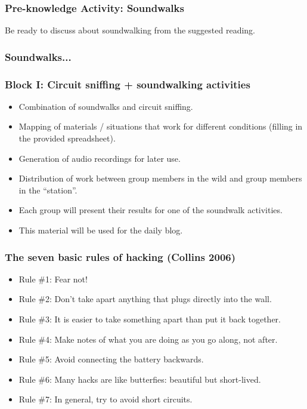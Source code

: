 \documentclass[screen, aspectratio=43]{beamer}
\begin{document}
%
\begin{frame}
  \frametitle{Pre-knowledge Activity: Soundwalks}
  Be ready to discuss about soundwalking from the suggested reading.
\end{frame}
%
\begin{frame}
  \frametitle{Soundwalks...}
  
\end{frame}
%
\begin{frame}
  \frametitle{Block I: Circuit sniffing + soundwalking activities}
        \begin{itemize}
	\item Combination of soundwalks and circuit sniffing.
	\item Mapping of materials / situations that work for different conditions (filling in the provided spreadsheet).
	\item Generation of audio recordings for later use.
	\item Distribution of work between group members in the wild and group members in the ``station''. 
	\item Each group will present their results for one of the soundwalk activities.
	\item This material will be used for the daily blog.
    \end{itemize} 
\end{frame}
%
\begin{frame}
  \frametitle{The seven basic rules of hacking (Collins 2006)}
        \begin{itemize}
	\item Rule \#1: Fear not!
	\item Rule \#2: Don't take apart anything that plugs directly into the wall.
	\item Rule \#3: It is easier to take something apart than put it back together.
	\item Rule \#4: Make notes of what you are doing as you go along, not after.
	\item Rule \#5: Avoid connecting the battery backwards.
	\item Rule \#6: Many hacks are like butterfies: beautiful but short-lived.
	\item Rule \#7: In general, try to avoid short circuits.
    \end{itemize} 
\end{frame}
%
\end{document}
